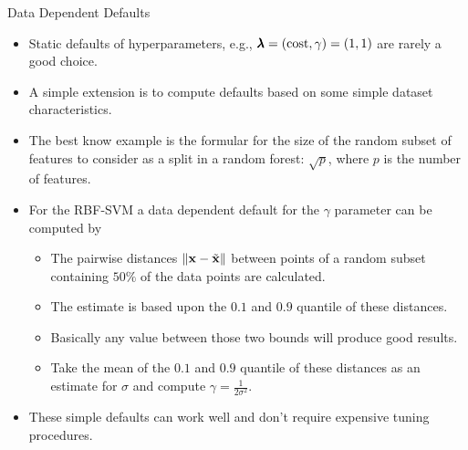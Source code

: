 \begin{frame}{Data Dependent Defaults}

    \begin{itemize}
            \item Static defaults of hyperparameters, e.g., $\pmb{\lambda} = (\text{cost},\gamma) = (1,1)$ are rarely a good choice.
            \item A simple extension is to compute defaults based on some simple dataset characteristics.
            \item The best know example is the formular for the size of the random subset of features to consider as a split in a random forest: $\sqrt{p}$, where $p$ is the number of features.
            \item For the RBF-SVM a data dependent default for the $\gamma$ parameter can be computed by
                \begin{itemize}
                     \item The pairwise distances $\|\mathbf{x} - \tilde {\mathbf{x}} \|$ between points of a random subset containing $50\%$ of the data points are calculated.
                     \item The estimate is based upon the $0.1$ and $0.9$ quantile of these distances.
                     \item Basically any value between those two bounds will produce good results.
                     \item Take the mean of the $0.1$ and $0.9$ quantile of these distances as an estimate for $\sigma$ and compute $\gamma = \tfrac{1}{2\sigma^2}$.
                \end{itemize}
            \item These simple defaults can work well and don't require expensive tuning procedures.
    \end{itemize}
\end{frame}



